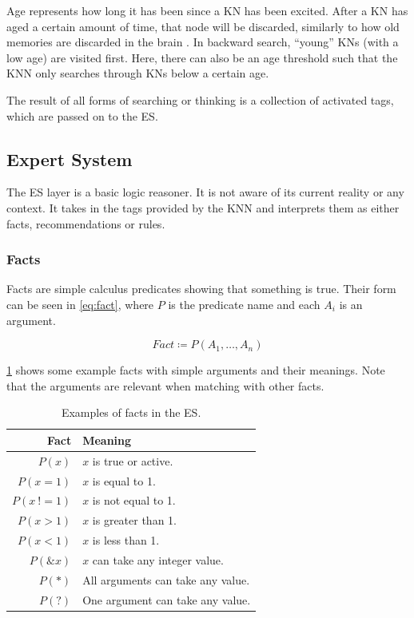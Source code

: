 \documentclass[titlepage,11pt]{article}
\begin{document}
Age represents how long it has been since a KN has been excited. After a KN has aged a certain amount of time, that node will be discarded, similarly to how old memories are discarded in the brain \cite{aging}. In backward search, ``young'' KNs (with a low age) are visited first. Here, there can also be an age threshold such that the KNN only searches through KNs below a certain age.

The result of all forms of searching or thinking is a collection of activated tags, which are passed on to the ES.

\subsection{Expert System} \label{sec:background_expert_system}

The ES layer is a basic logic reasoner. It is not aware of its current reality or any context. It takes in the tags provided by the KNN and interprets them as either facts, recommendations or rules.

\subsubsection{Facts}
Facts are simple calculus predicates showing that something is true. Their form can be seen in \cref{eq:fact}, where $P$ is the predicate name and each $A_i$ is an argument.

\begin{equation} \label{eq:fact}
	Fact \coloneqq P(A_1, \ldots, A_n)
\end{equation}

\cref{table:fact_predicates} shows some example facts with simple arguments and their meanings. Note that the arguments are relevant when matching with other facts.

\begin{table}[!htb] \small
	\centering
	\caption{Examples of facts in the ES.}
	\begin{tabular}{r | l}
		\textbf{Fact} & \textbf{Meaning} \\ \hline
		$P(x)$ & $x$ is true or active.\\
		$P(x = 1)$ & $x$ is equal to 1. \\
		$P(x \ != 1)$ & $x$ is not equal to 1. \\
		$P(x > 1)$ & $x$ is greater than 1. \\
		$P(x < 1)$ & $x$ is less than 1. \\
		$P(\&x)$ & $x$ can take any integer value. \\
		$P(*)$ & All arguments can take any value. \\
		$P(?)$ & One argument can take any value. \\
	\end{tabular}
	\label{table:fact_predicates}
\end{table}
\end{document}
